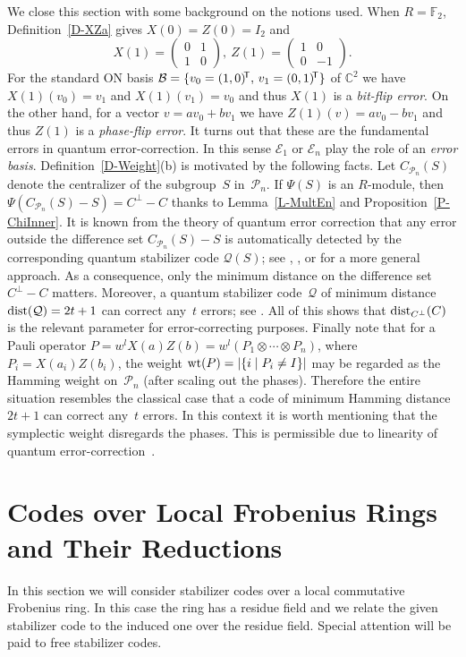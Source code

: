 \documentclass[11pt]{article}
\theoremstyle{definition}
\numberwithin{equation}{section}
\newcommand{\F}{{\mathbb F}}
\newcommand{\cE}{{\mathcal E}}
\newcommand{\cP}{{\mathcal P}}
\newcommand{\cQ}{{\mathcal Q}}
\newcommand{\cB}{{\mathcal B}}
\newcommand{\wt}{{\rm wt}}
\newcommand{\T}{\mbox{$\!^{\sf T}$}}
\newcommand{\dist}{\textup{dist}}
\newcounter{ara}
\newcounter{rom}
\begin{document}
We close this section with some background on the notions used. When $R = \F_2$, Definition~\ref{D-XZa} gives $X(0)=Z(0)=I_2$ and
\[
    X(1)=\begin{pmatrix}0&1\\1&0\end{pmatrix},\
    Z(1)=\begin{pmatrix}1&0\\0&-1\end{pmatrix}.
\]
For the standard ON basis $\cB=\{v_0=(1,0)\T,\,v_1=(0,1)\T\}$ of $\mathbb{C}^2$ we have $X(1)(v_0) = v_1$ and $X(1)(v_1) = v_0$ and thus $X(1)$ is a \emph{bit-flip error}.
On the other hand, for a vector $v = av_0 + bv_1$ we have $Z(1)(v) = av_0 - bv_1$ and thus $Z(1)$ is a \emph{phase-flip error}.
It turns out that these are the fundamental errors in quantum error-correction. In this sense $\cE_1$ or $\cE_n$ play the role of an \emph{error basis}.
Definition~\ref{D-Weight}(b) is motivated by the following facts.
Let  $C_{\cP_n}(S)$ denote the centralizer of the subgroup~$S$ in~$\cP_n$.
If $\Psi(S)$ is an $R$-module, then $\Psi(C_{\cP_n}(S) -S)=C^{\perp}-C$ thanks to Lemma~\ref{L-MultEn} and Proposition~\ref{P-ChiInner}.
It is known from the theory of quantum error correction that any error outside the difference set $C_{\cP_n}(S) -S$
is automatically detected by the corresponding quantum stabilizer code $\cQ(S)$; see
\cite[Lem.~11]{KKKS06}, \cite[Lem.~1]{CRSS98}, or \cite[Thm.~3.4]{Kn96a} for a more general approach.
As a consequence, only the minimum distance on the difference set $C^{\perp}-C$ matters.
Moreover, a quantum stabilizer code~$\cQ$ of  minimum distance $\dist(\cQ)=2t+1$ can correct any~$t$ errors; see \cite[Thm.~1]{CRSS98}.
All of this shows that $\dist_{C^\perp}(C)$ is the relevant parameter for error-correcting purposes.
Finally note that for a Pauli operator $P = w^lX(a)Z(b) = w^l(P_1\otimes\cdots\otimes P_n)$, where $P_i=X(a_i)Z(b_i)$, the weight
$\wt(P) = |\{i\mid P_i \neq I\}|$ may be regarded as the Hamming weight on~$\cP_n$ (after scaling out the phases).
Therefore the entire situation resembles the classical case that a code of minimum Hamming distance $2t+1$
can correct any~$t$ errors.
In this context it is worth mentioning that the symplectic weight disregards the phases.
This is permissible due to linearity of quantum error-correction~\cite[Thm.~3.1]{KnLa97}.


\section{Codes over Local Frobenius Rings and Their Reductions}\label{SS-RedDim}
In this section we will consider stabilizer codes over a local commutative Frobenius ring.
In this case the ring has a residue field and we relate the given stabilizer code to the induced one over the residue field.
Special attention will be paid to free stabilizer codes.
\end{document}
